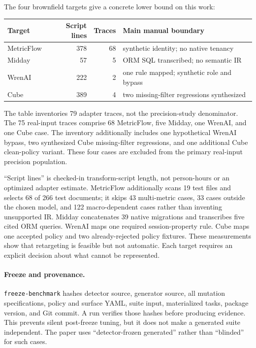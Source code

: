 The four brownfield targets give a concrete lower bound on this work:

\begin{center}
\scriptsize
\setlength{\tabcolsep}{2pt}
\begin{tabular}{@{}L{0.21\columnwidth}r r L{0.43\columnwidth}@{}}
\toprule
Target & Script lines & Traces & Main manual boundary \\
\midrule
MetricFlow & 378 & 68 & synthetic identity; no native tenancy \\
Midday & 57 & 5 & ORM SQL transcribed; no semantic IR \\
WrenAI & 222 & 2 & one rule mapped; synthetic role and bypass \\
Cube & 389 & 4 & two missing-filter regressions synthesized \\
\bottomrule
\end{tabular}
\end{center}

The table inventories 79 adapter traces, not the precision-study denominator. The 75 real-input traces comprise 68 MetricFlow, five Midday, one WrenAI, and one Cube case. The inventory additionally includes one hypothetical WrenAI bypass, two synthesized Cube missing-filter regressions, and one additional Cube clean-policy variant. These four cases are excluded from the primary real-input precision population.

``Script lines'' is checked-in transform-script length, not person-hours or an optimized adapter estimate. MetricFlow additionally scans 19 test files and selects 68 of 266 test documents; it skips 43 multi-metric cases, 33 cases outside the chosen model, and 122 macro-dependent cases rather than inventing unsupported IR. Midday concatenates 39 native migrations and transcribes five cited ORM queries. WrenAI maps one required session-property rule. Cube maps one accepted policy and two already-rejected policy fixtures. These measurements show that retargeting is feasible but not automatic. Each target requires an explicit decision about what cannot be represented.

\paragraph{Freeze and provenance.}
\texttt{freeze-benchmark} hashes detector source, generator source, all mutation specifications, policy and surface YAML, suite input, materialized tasks, package version, and Git commit. A run verifies those hashes before producing evidence. This prevents silent post-freeze tuning, but it does not make a generated suite independent. The paper uses ``detector-frozen generated'' rather than ``blinded'' for such cases.

